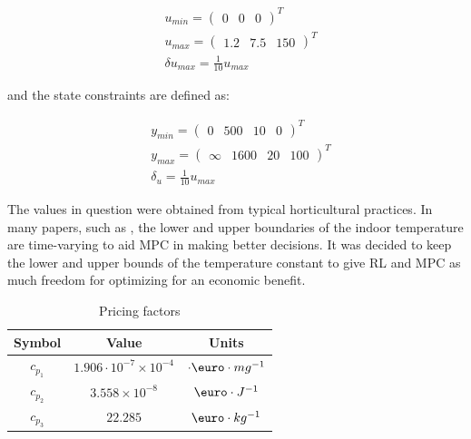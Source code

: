 \begin{equation}\label{eq:input constraints}
	\begin{aligned}
		&u_{min} = \begin{pmatrix}
			0&0&0
		\end{pmatrix}^T \\
	&u_{max} = \begin{pmatrix}
		1.2&7.5&150
	\end{pmatrix}^T	\\
& \delta u_{max} = \frac{1}{10} u_{max}
	\end{aligned}
\end{equation}

and the state constraints are defined as:

\begin{equation}\label{eq:state constraints}
	\begin{aligned}
		&y_{min} = \begin{pmatrix}
			0&500&10&0
		\end{pmatrix}^T \\
		&y_{max} = \begin{pmatrix}
			\infty&1600&20&100
		\end{pmatrix}^T	\\
		& \delta_u = \frac{1}{10} u_{max}
	\end{aligned}
\end{equation}

The values in question were obtained from typical horticultural practices. In many papers, such as \citet{boersmaRobustSamplebasedModel2022}, the lower and upper boundaries of the indoor temperature are time-varying to aid MPC in making better decisions. It was decided to keep the lower and upper bounds of the temperature constant to give RL and MPC as much freedom for optimizing for an economic benefit.

\begin{table}[H]
	\centering
	\begin{tabular}{|c|c|c|}
		\hline
		\textbf{Symbol} & \textbf{Value} & \textbf{Units} \\
		\hline
		$c_{p_1}$ & $1.906\cdot 10^{-7} \times 10^{-4}$ & $ \cdot \text{\euro} \cdot mg^{-1}$ \\
		$c_{p_2}$ & $3.558 \times 10^{-8}$ & $ \text{\euro} \cdot J^{-1}$ \\
		$c_{p_3}$ & $22.285$ & $\text{\euro} \cdot kg^{-1}$ \\ 
		\hline
	\end{tabular}
	\caption{Pricing factors}
	\label{tab:pricing_factors}
\end{table}


